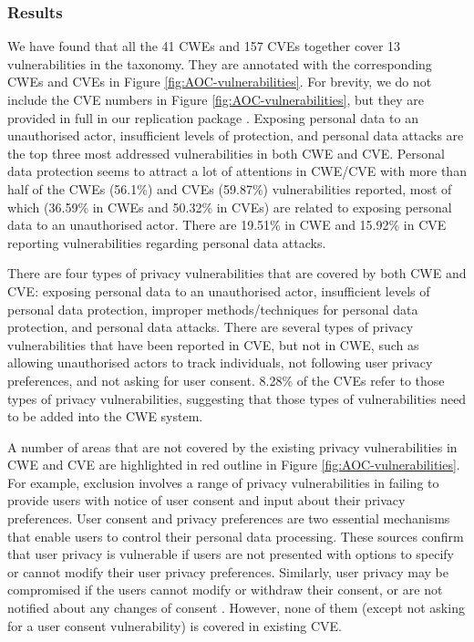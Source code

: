 \subsubsection{Results}

We have found that all the 41 CWEs and 157 CVEs together cover 13 vulnerabilities in the taxonomy. They are annotated with the corresponding CWEs and CVEs in Figure \ref{fig:AOC-vulnerabilities}. For brevity, we do not include the CVE numbers in Figure \ref{fig:AOC-vulnerabilities}, but they are provided in full in our replication package \cite{rep-pkg-privul}. Exposing personal data to an unauthorised actor, insufficient levels of protection, and personal data attacks are the top three most addressed vulnerabilities in both CWE and CVE. Personal data protection seems to attract a lot of attentions in CWE/CVE with more than half of the CWEs (56.1\%) and CVEs (59.87\%) vulnerabilities reported, most of which (36.59\% in CWEs and 50.32\% in CVEs) are related to exposing personal data to an unauthorised actor. There are 19.51\% in CWE and 15.92\% in CVE reporting vulnerabilities regarding personal data attacks.

There are four types of privacy vulnerabilities that are covered by both CWE and CVE: exposing personal data to an unauthorised actor, insufficient levels of personal data protection, improper methods/techniques for personal data protection, and personal data attacks. There are several types of privacy vulnerabilities that have been reported in CVE, but not in CWE, such as allowing unauthorised actors to track individuals, not following user privacy preferences, and not asking for user consent. 8.28\% of the CVEs refer to those types of privacy vulnerabilities, suggesting that those types of vulnerabilities need to be added into the CWE system.

A number of areas that are not covered by the existing privacy vulnerabilities in CWE and CVE are highlighted in red outline in Figure \ref{fig:AOC-vulnerabilities}. For example, exclusion involves a range of privacy vulnerabilities in failing to provide users with notice of user consent and input about their privacy preferences. User consent and privacy preferences are two essential mechanisms that enable users to control their personal data processing. These sources \cite{Antn2004, ISO/IEC2011, HIPAA} confirm that user privacy is vulnerable if users are not presented with options to specify or cannot modify their user privacy preferences. Similarly, user privacy may be  compromised if the users cannot modify or withdraw their consent, or are not notified about any changes of consent \cite{OfficeJournaloftheEuropeanUnion;2016, ISO/IEC2011, HIPAA, APA, OWASPsurvey}. However, none of them (except not asking for a user consent vulnerability) is covered in existing CVE.

